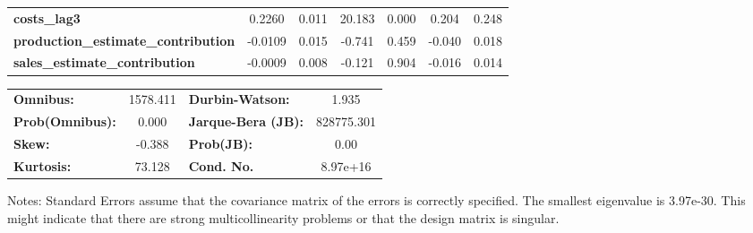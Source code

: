 \begin{center}
\begin{tabular}{lcccccc}
\textbf{costs\_lag3}                        &       0.2260  &        0.011     &    20.183  &         0.000        &        0.204    &        0.248     \\
\textbf{production\_estimate\_contribution} &      -0.0109  &        0.015     &    -0.741  &         0.459        &       -0.040    &        0.018     \\
\textbf{sales\_estimate\_contribution}      &      -0.0009  &        0.008     &    -0.121  &         0.904        &       -0.016    &        0.014     \\
\bottomrule
\end{tabular}
\begin{tabular}{lclc}
\textbf{Omnibus:}       & 1578.411 & \textbf{  Durbin-Watson:     } &     1.935   \\
\textbf{Prob(Omnibus):} &   0.000  & \textbf{  Jarque-Bera (JB):  } & 828775.301  \\
\textbf{Skew:}          &  -0.388  & \textbf{  Prob(JB):          } &      0.00   \\
\textbf{Kurtosis:}      &  73.128  & \textbf{  Cond. No.          } &  8.97e+16   \\
\bottomrule
\end{tabular}
\end{center}

Notes: \newline
 [1] Standard Errors assume that the covariance matrix of the errors is correctly specified. \newline
 [2] The smallest eigenvalue is 3.97e-30. This might indicate that there are \newline
 strong multicollinearity problems or that the design matrix is singular.